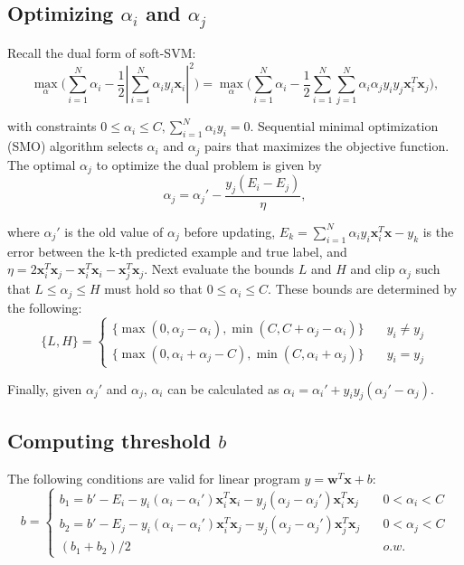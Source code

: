 \documentclass[../main.tex]{subfiles}
\begin{document}
\setlength{\parindent}{0pt}
\subsection{Optimizing $\alpha_i$ and $\alpha_j$}
Recall the dual form of soft-SVM:$$\max_{\alpha}\bigg(\sum_{i=1}^N \alpha_i-\frac{1}{2}|\sum_{i=1}^N\alpha_i y_i \textbf{x}_i|^2\bigg)=\max_{\alpha}\bigg(\sum_{i=1}^N \alpha_i-\frac{1}{2}\sum_{i=1}^N\sum_{j=1}^N\alpha_i\alpha_j y_i y_j \textbf{x}_i^T\textbf{x}_j\bigg),$$

with constraints $0\leq \alpha_i\leq C, \sum_{i=1}^N\alpha_iy_i=0$. Sequential minimal optimization (SMO) algorithm selects $\alpha_i$ and $\alpha_j$ pairs that maximizes the objective function. The optimal $\alpha_j$ to optimize the dual problem is given by $$\alpha_j = \alpha_j'-\frac{y_j(E_i-E_j)}{\eta},$$

where $\alpha_j'$ is the old value of $\alpha_j$ before updating, $E_k=\sum_{i=1}^N\alpha_iy_i\textbf{x}_i^T\textbf{x}-y_k$ is the error between the k-th predicted example and true label, and $\eta=2\textbf{x}_i^T\textbf{x}_j-\textbf{x}_i^T\textbf{x}_i-\textbf{x}_j^T\textbf{x}_j$. Next evaluate the bounds $L$ and $H$ and clip $\alpha_j$ such that $L\leq \alpha_j \leq H$ must hold so that $0\leq \alpha_i \leq C$. These bounds are determined by the following:
\begin{equation} \label{eq3-7}
\{ L, H \} = \left\{
        \begin{array}{ll}
            \{\max(0, \alpha_j-\alpha_i), \min(C, C+\alpha_j-\alpha_i)\} & \quad y_i\neq y_j \\
            \{\max(0, \alpha_i+\alpha_j-C), \min(C, \alpha_i+\alpha_j)\} & \quad y_i=y_j
        \end{array}
    \right.
\end{equation}

Finally, given $\alpha_j'$ and $\alpha_j$, $\alpha_i$ can be calculated as $\alpha_i=\alpha_i'+y_iy_j(\alpha_j'-\alpha_j)$.

\subsection{Computing threshold $b$}
The following conditions are valid for linear program $y=\textbf{w}^T\textbf{x}+b$:
\begin{equation} \label{eq3-8}
b = \left\{
        \begin{array}{ll}
            b_1=b'-E_i-y_i(\alpha_i-\alpha_i')\textbf{x}_i^T\textbf{x}_i-y_j(\alpha_j-\alpha_j')\textbf{x}_i^T\textbf{x}_j & \quad 0<\alpha_i<C \\
            b_2=b'-E_j-y_i(\alpha_i-\alpha_i')\textbf{x}_i^T\textbf{x}_j-y_j(\alpha_j-\alpha_j')\textbf{x}_j^T\textbf{x}_j & \quad 0<\alpha_j<C \\
            (b_1+b_2)/2 & \quad o.w.
        \end{array}
    \right.
\end{equation}
\end{document}
